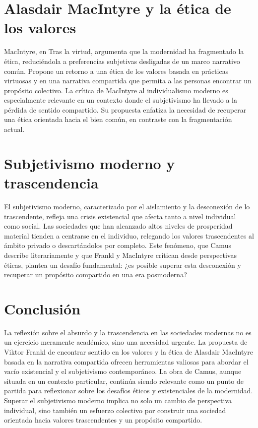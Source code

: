 \documentclass[]{article}
\begin{document}
\section{Alasdair MacIntyre y la ética de los valores}
MacIntyre, en Tras la virtud, argumenta que la modernidad ha fragmentado la ética, reduciéndola a preferencias subjetivas desligadas de un marco narrativo común. Propone un retorno a una ética de los valores basada en prácticas virtuosas y en una narrativa compartida que permita a las personas encontrar un propósito colectivo.
La crítica de MacIntyre al individualismo moderno es especialmente relevante en un contexto donde el subjetivismo ha llevado a la pérdida de sentido compartido. Su propuesta enfatiza la necesidad de recuperar una ética orientada hacia el bien común, en contraste con la fragmentación actual.
\section{Subjetivismo moderno y trascendencia}
El subjetivismo moderno, caracterizado por el aislamiento y la desconexión de lo trascendente, refleja una crisis existencial que afecta tanto a nivel individual como social. Las sociedades que han alcanzado altos niveles de prosperidad material tienden a centrarse en el individuo, relegando los valores trascendentes al ámbito privado o descartándolos por completo.
Este fenómeno, que Camus describe literariamente y que Frankl y MacIntyre critican desde perspectivas éticas, plantea un desafío fundamental: ¿es posible superar esta desconexión y recuperar un propósito compartido en una era posmoderna?
\section{Conclusión}
La reflexión sobre el absurdo y la trascendencia en las sociedades modernas no es un ejercicio meramente académico, sino una necesidad urgente. La propuesta de Viktor Frankl de encontrar sentido en los valores y la ética de Alasdair MacIntyre basada en la narrativa compartida ofrecen herramientas valiosas para abordar el vacío existencial y el subjetivismo contemporáneo.
La obra de Camus, aunque situada en un contexto particular, continúa siendo relevante como un punto de partida para reflexionar sobre los desafíos éticos y existenciales de la modernidad. Superar el subjetivismo moderno implica no solo un cambio de perspectiva individual, sino también un esfuerzo colectivo por construir una sociedad orientada hacia valores trascendentes y un propósito compartido.
\end{document}
